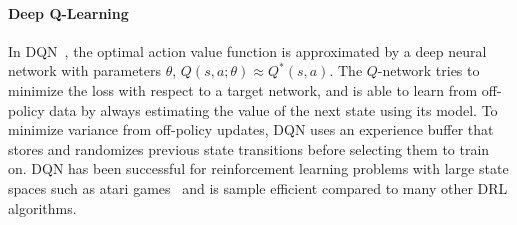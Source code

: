 \paragraph{Deep Q-Learning}
In DQN~\cite{mnih2015human}, the optimal action value function is approximated by a deep neural network with parameters $\theta$, $Q(s,a; \theta) \approx Q^*(s,a)$. The $Q$-network tries to minimize the loss with respect to a target network, and is able to learn from off-policy data by always estimating the value of the next state using its model. To minimize variance from off-policy updates, DQN uses an experience buffer that stores and randomizes previous state transitions before selecting them to train on. DQN has been successful for reinforcement learning problems with large state spaces such as atari games~\cite{mnih2015human} and is sample efficient compared to many other DRL algorithms. 

